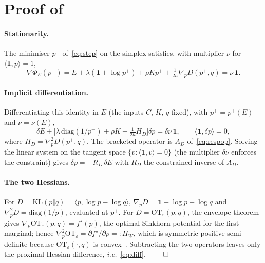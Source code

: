 \documentclass{article}
\theoremstyle{plain}
\newcommand{\ie}{\textit{i.e.}}
\begin{document}
\section{Proof of }
\label{app:proofs}

\paragraph{Stationarity.}
The minimiser $p^+$ of~\eqref{eq:step} on the simplex satisfies, with multiplier $\nu$ for $\langle\mathbf 1,p\rangle=1$,
\[
  \nabla\Phi_E(p^+) = E + \lambda(\mathbf 1 + \log p^+) + \rho K p^+ + \tfrac{1}{2h}\nabla_p D(p^+,q) = \nu\,\mathbf 1.
\]
\paragraph{Implicit differentiation.}
Differentiating this identity in $E$ (the inputs $C$, $K$, $q$ fixed), with $p^+=p^+(E)$ and $\nu=\nu(E)$,
\[
  \delta E + \Big[\lambda\,\mathrm{diag}(1/p^+) + \rho K + \tfrac{1}{2h}H_D\Big]\delta p = \delta\nu\,\mathbf 1,
  \qquad \langle\mathbf 1,\delta p\rangle = 0,
\]
where $H_D=\nabla^2_p D(p^+,q)$. The bracketed operator is $A_D$ of~\eqref{eq:respop}. Solving the linear system on the tangent space $\{v:\langle\mathbf 1,v\rangle=0\}$ (the multiplier $\delta\nu$ enforces the constraint) gives $\delta p = -R_D\,\delta E$ with $R_D$ the constrained inverse of $A_D$.
\paragraph{The two Hessians.}
For $D=\mathrm{KL}(p\Vert q)=\langle p,\log p-\log q\rangle$, $\nabla_p D = \mathbf 1+\log p-\log q$ and $\nabla^2_p D=\mathrm{diag}(1/p)$, evaluated at $p^+$. For $D=\mathrm{OT}_\varepsilon(p,q)$, the envelope theorem gives $\nabla_p\mathrm{OT}_\varepsilon(p,q)=f^\star(p)$, the optimal Sinkhorn potential for the first marginal; hence $\nabla^2_p\mathrm{OT}_\varepsilon = \partial f^\star/\partial p =: H_W$, which is symmetric positive semi-definite because $\mathrm{OT}_\varepsilon(\cdot,q)$ is convex~\cite{luise2018differential,eisenberger2022unified}. Subtracting the two operators leaves only the proximal-Hessian difference, \ie~\eqref{eq:diff}. \hfill$\qed$
\end{document}
